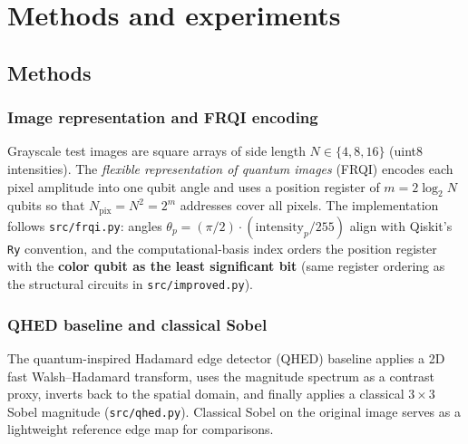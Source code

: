 \chapter{Methods and experiments}
\thispagestyle{pagestyle}

\graphicspath{{../../outputs/}}

\section{Methods}

\subsection{Image representation and FRQI encoding}
Grayscale test images are square arrays of side length $N \in \{4,8,16\}$ (uint8 intensities). The \emph{flexible representation of quantum images} (FRQI) encodes each pixel amplitude into one qubit angle and uses a position register of $m = 2\log_2 N$ qubits so that $N_{\mathrm{pix}} = N^2 = 2^m$ addresses cover all pixels. The implementation follows \texttt{src/frqi.py}: angles $\theta_p = (\pi/2)\cdot (\mathrm{intensity}_p/255)$ align with Qiskit's \texttt{Ry} convention, and the computational-basis index orders the position register with the \textbf{color qubit as the least significant bit} (same register ordering as the structural circuits in \texttt{src/improved.py}).

\subsection{QHED baseline and classical Sobel}
The quantum-inspired Hadamard edge detector (QHED) baseline applies a 2D fast Walsh--Hadamard transform, uses the magnitude spectrum as a contrast proxy, inverts back to the spatial domain, and finally applies a classical $3\times 3$ Sobel magnitude (\texttt{src/qhed.py}). Classical Sobel on the original image serves as a lightweight reference edge map for comparisons.

